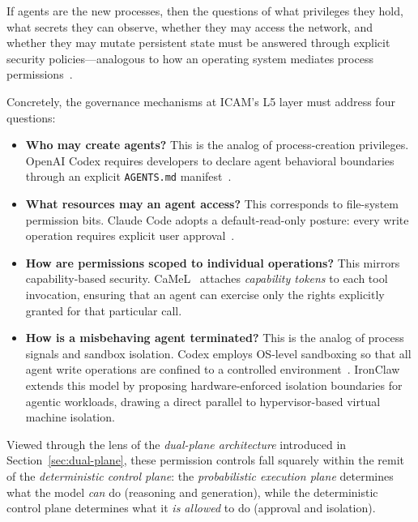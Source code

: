 \documentclass[11pt,a4paper]{article}
\begin{document}
If agents are the new processes, then the questions of what privileges they hold, what secrets they can observe, whether they may access the network, and whether they may mutate persistent state must be answered through explicit security policies---analogous to how an operating system mediates process permissions~\cite{openai_codex_approvals_2026,openai_codex_sandbox_2026,anthropic_claudecode_security_2026,anthropic_claudecode_sandbox_2026,debenedetti2025camel,ironclaw2025}.

Concretely, the governance mechanisms at ICAM's L5 layer must address four questions:

\begin{itemize}[nosep]
\item \textbf{Who may create agents?} This is the analog of process-creation privileges. OpenAI Codex requires developers to declare agent behavioral boundaries through an explicit \texttt{AGENTS.md} manifest~\cite{openai_codex_agents_md_2026}.
\item \textbf{What resources may an agent access?} This corresponds to file-system permission bits. Claude Code adopts a default-read-only posture: every write operation requires explicit user approval~\cite{anthropic_claudecode_security_2026}.
\item \textbf{How are permissions scoped to individual operations?} This mirrors capability-based security. CaMeL~\cite{debenedetti2025camel} attaches \textit{capability tokens} to each tool invocation, ensuring that an agent can exercise only the rights explicitly granted for that particular call.
\item \textbf{How is a misbehaving agent terminated?} This is the analog of process signals and sandbox isolation. Codex employs OS-level sandboxing so that all agent write operations are confined to a controlled environment~\cite{openai_codex_sandbox_2026}. IronClaw~\cite{ironclaw2025} extends this model by proposing hardware-enforced isolation boundaries for agentic workloads, drawing a direct parallel to hypervisor-based virtual machine isolation.
\end{itemize}

Viewed through the lens of the \textit{dual-plane architecture} introduced in Section~\ref{sec:dual-plane}, these permission controls fall squarely within the remit of the \textit{deterministic control plane}: the \textit{probabilistic execution plane} determines what the model \emph{can} do (reasoning and generation), while the deterministic control plane determines what it \emph{is allowed} to do (approval and isolation).
\end{document}
